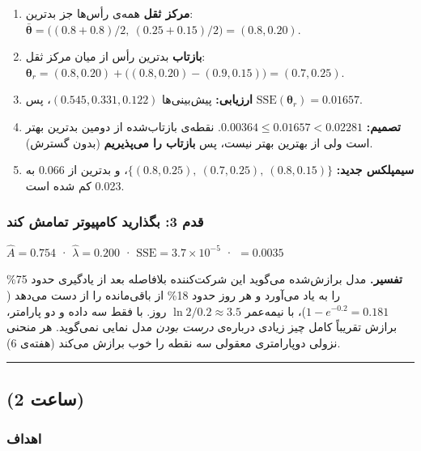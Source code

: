 \begin{enumerate}
\def\labelenumi{\arabic{enumi}.}
\tightlist
\item
  \textbf{مرکز ثقل} همه‌ی رأس‌ها جز بدترین:
  \(\bar{\boldsymbol\theta} = \big((0.8 + 0.8)/2,\ (0.25 + 0.15)/2\big) = (0.8,\allowbreak 0.20)\).
\item
  \textbf{بازتاب} بدترین رأس از میان مرکز ثقل:
  \(\boldsymbol\theta_r = (0.8,\allowbreak 0.20) + \big((0.8,\allowbreak 0.20) - (0.9,\allowbreak 0.15)\big) = (0.7,\allowbreak 0.25)\).
\item
  \textbf{ارزیابی:} پیش‌بینی‌ها \((0.545, 0.331, 0.122)\)، پس
  \(\mathrm{SSE}(\boldsymbol\theta_r) = 0.01657\).
\item
  \textbf{تصمیم:} \(0.00364 \le 0.01657 < 0.02281\). نقطه‌ی بازتاب‌شده از
  دومین بدترین بهتر است ولی از بهترین بهتر نیست، پس \textbf{بازتاب را
  می‌پذیریم} (بدون گسترش).
\item
  \textbf{سیمپلکس جدید:}
  \(\{(0.8,\allowbreak 0.25),\ (0.7,\allowbreak 0.25),\ (0.8,\allowbreak 0.15)\}\)، و بدترین  از
  0.066 به 0.023 کم شده است.
\end{enumerate}

\subsubsection{قدم 3: بگذارید کامپیوتر تمامش کند}

\(\hat A = 0.754\) · \(\hat\lambda = 0.200\) ·
\(\mathrm{SSE} = 3.7 \times 10^{-5}\) · \(= 0.0035\)

\textbf{تفسیر.} مدل برازش‌شده می‌گوید این شرکت‌کننده بلافاصله بعد از
یادگیری حدود 75\% را به یاد می‌آورد و هر روز حدود 18\% از باقی‌مانده را از
دست می‌دهد (\(1 - e^{-0.2} = 0.181\))، با نیمه‌عمر
\(\ln 2 / 0.2 \approx 3.5\) روز. با فقط سه داده و دو پارامتر، برازش
تقریباً کامل چیز زیادی درباره‌ی \emph{درست بودن} مدل نمایی نمی‌گوید. هر
منحنی نزولی دوپارامتری معقولی سه نقطه را خوب برازش می‌کند (هفته‌ی 6).

\begin{center}\rule{0.5\linewidth}{0.5pt}\end{center}


\subsection{\texorpdfstring{ (2 ساعت)}{lab (2 ساعت)}}

\subsubsection{اهداف}


